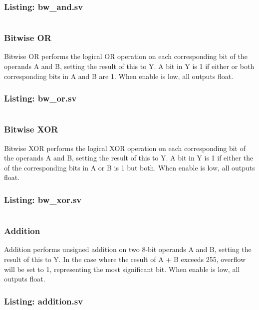 \documentclass[12pt,letterpaper]{article}
\begin{document}
\subsubsection*{Listing: bw\_and.sv}
\inputminted[bgcolor = bggray, linenos, fontsize = \footnotesize, breaklines]{sv}{"../ALU_SystemVerilog/functions/bw_and.sv"}


\subsubsection{Bitwise OR}
Bitwise OR performs the logical OR operation on each corresponding bit of the operands A and B, setting the result of this to Y. 
A bit in Y is 1 if either or both corresponding bits in A and B are 1. When enable is low, all outputs float.
\subsubsection*{Listing: bw\_or.sv}
\inputminted[bgcolor = bggray, linenos, fontsize = \footnotesize, breaklines]{sv}{"../ALU_SystemVerilog/functions/bw_or.sv"}


\subsubsection{Bitwise XOR}
Bitwise XOR performs the logical XOR operation on each corresponding bit of the operands A and B, setting the result of this to Y.
A bit in Y is 1 if either the of the corresponding bits in A or B is 1 but both. When enable is low, all outputs float.
\subsubsection*{Listing: bw\_xor.sv}
\inputminted[bgcolor = bggray, linenos, fontsize = \footnotesize, breaklines]{sv}{"../ALU_SystemVerilog/functions/bw_xor.sv"}


\subsubsection{Addition}
Addition performs unsigned addition on two 8-bit operands A and B, setting the result of this to Y. In the case where the result
of A + B exceeds 255, overflow will be set to 1, representing the most significant bit. When enable is low, all outputs float.
\subsubsection*{Listing: addition.sv}
\inputminted[bgcolor = bggray, linenos, fontsize = \footnotesize, breaklines]{sv}{"../ALU_SystemVerilog/functions/addition.sv"}
\end{document}
